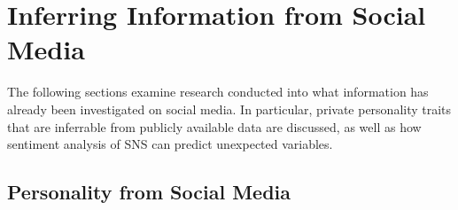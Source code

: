 \section{Inferring Information from Social Media}

The following sections examine research conducted into what information has already been investigated on social media. In particular, private personality traits that are inferrable from publicly available data are discussed, as well as how sentiment analysis of SNS can predict unexpected variables. 



\subsection{Personality from Social Media}

